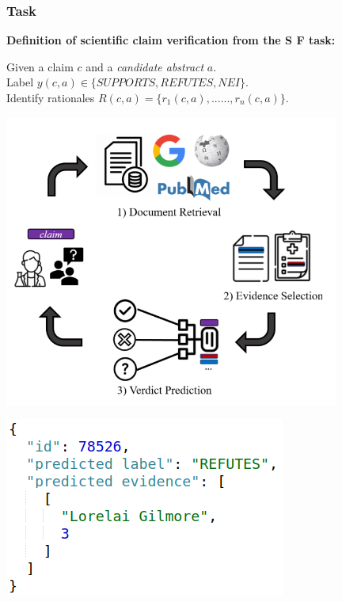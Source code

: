 \documentclass[13.5pt,aspecratio=169, xcolor=dvipsnames]{beamer}
\newcommand{\raisedtext}[1]{%
  \raisebox{-0.2ex}{#1}%
}
\begin{document}

\begin{frame}
    \onehalfspacing
    \frametitle{Task}
    \textbf{Definition of scientific claim verification from the S\raisedtext{CI}F\raisedtext{ACT} task:}
    \vspace*{-1em} 
    \begin{mybox}
            Given a claim $c$ and a \textit{candidate abstract} $a$. \\
            Label $y(c,a) \in \{SUPPORTS, REFUTES, NEI\}.$ \\
            Identify rationales $R(c, a) = \{r_1(c, a),......,r_n(c, a)\}.$
      \end{mybox}

      \begin{minipage}{0.45\textwidth}
        \includegraphics[width=\textwidth]{Task_Definition.png}
      \end{minipage}
      \begin{minipage}{0.45\textwidth}
        \includegraphics[width=\textwidth]{Json_data.png}
      \end{minipage}
\end{frame}
    
\end{document}
